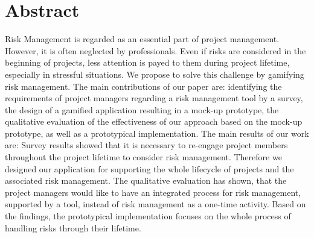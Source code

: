 
{\let\clearpage\relax\chapter*{Abstract}}

Risk Management is regarded as an essential part of project management. However, it is often neglected by professionals. Even if risks are considered in the beginning of projects, less attention is payed to them during project lifetime, especially in stressful situations. 
We propose to solve this challenge by gamifying risk management. 
The main contributions of our paper are:
identifying the requirements of project managers regarding a risk management tool by a survey, the design of a gamified application resulting in a mock-up prototype, the qualitative evaluation of the effectiveness of our approach based on the mock-up prototype, as well as a prototypical implementation. 
The main results of our work are:
Survey results showed that it is necessary to re-engage project members throughout the project lifetime to consider risk management. Therefore we designed our application for supporting the whole lifecycle of projects and the associated risk management. The qualitative evaluation has shown, that the project managers would like to have an integrated process for risk management, supported by a tool, instead of risk management as a one-time activity. Based on the findings, the prototypical implementation focuses on the whole process of handling risks through their lifetime.